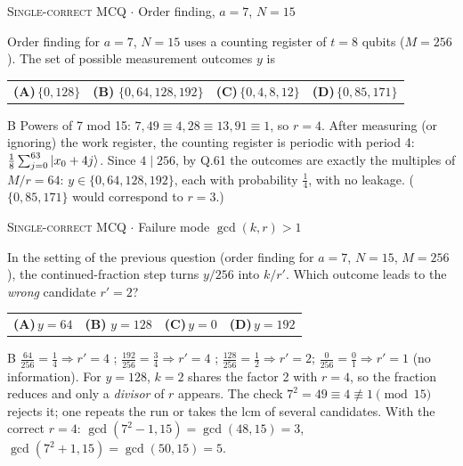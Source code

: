 \documentclass[11pt,a4paper]{article}
\newcommand{\optlabel}[1]{\textbf{(#1)}}
\newcommand{\correctlabel}[1]{\textcolor{okgreen}{\textbf{(#1)}\,\ding{51}}}
\newenvironment{qitem}[1]{\begin{list}{}{\setlength{\leftmargin}{3.3em}\setlength{\labelwidth}{3.1em}%
  \setlength{\labelsep}{0.2em}\setlength{\topsep}{3pt}\setlength{\parsep}{3pt}}\item[\textbf{Q.#1}\hfill]}{\end{list}}
\newcommand{\qsep}{\par\vspace{2pt}{\color{black!15}\hrule}\vspace{4pt}}
\newcommand{\qmeta}[2]{{\footnotesize\color{black!60}\textsc{#1} \;$\cdot$\; #2}\par}
\begin{document}
\begin{qitem}{69}
\qmeta{Single-correct MCQ}{Order finding, $a = 7$, $N = 15$}
Order finding for $a = 7$, $N = 15$ uses a counting register of $t = 8$ qubits ($M = 256$). The set of possible
measurement outcomes $y$ is
\par\smallskip\noindent\begin{tabularx}{\linewidth}{@{}*{4}{L}@{}}
\optlabel{A}\,$\{0, 128\}$ & \correctlabel{B}\,$\{0, 64, 128, 192\}$ & \optlabel{C}\,$\{0, 4, 8, 12\}$ & \optlabel{D}\,$\{0, 85, 171\}$
\end{tabularx}
\end{qitem}
\begin{solbox}{B}
Powers of 7 mod 15: $7, 49 \equiv 4, 28 \equiv 13, 91 \equiv 1$, so $r = 4$. After measuring (or ignoring) the work register,
the counting register is periodic with period 4: $\frac{1}{8}\sum_{j=0}^{63}\ket{x_0 + 4j}$. Since $4 \mid 256$, by Q.61 the
outcomes are exactly the multiples of $M/r = 64$: $y \in \{0, 64, 128, 192\}$, each with probability $\frac14$, with no
leakage. ($\{0,85,171\}$ would correspond to $r = 3$.)
\end{solbox}
\qsep

\begin{qitem}{70}
\qmeta{Single-correct MCQ}{Failure mode $\gcd(k, r) > 1$}
In the setting of the previous question (order finding for $a = 7$, $N = 15$, $M = 256$), the continued-fraction step
turns $y/256$ into $k/r'$. Which outcome leads to the \emph{wrong} candidate $r' = 2$?
\par\smallskip\noindent\begin{tabularx}{\linewidth}{@{}*{4}{L}@{}}
\optlabel{A}\,$y = 64$ & \correctlabel{B}\,$y = 128$ & \optlabel{C}\,$y = 0$ & \optlabel{D}\,$y = 192$
\end{tabularx}
\end{qitem}
\begin{solbox}{B}
$\frac{64}{256} = \frac14 \Rightarrow r' = 4$ \checkmark; $\frac{192}{256} = \frac34 \Rightarrow r' = 4$ \checkmark;
$\frac{128}{256} = \frac12 \Rightarrow r' = 2$; $\frac{0}{256} = \frac01 \Rightarrow r' = 1$ (no information).
For $y = 128$, $k = 2$ shares the factor 2 with $r = 4$, so the fraction reduces and only a \emph{divisor} of $r$ appears.
The check $7^2 = 49 \equiv 4 \not\equiv 1 \pmod{15}$ rejects it; one repeats the run or takes the lcm of several candidates.
With the correct $r = 4$: $\gcd(7^2 - 1, 15) = \gcd(48, 15) = 3$, $\gcd(7^2 + 1, 15) = \gcd(50, 15) = 5$.
\end{solbox}
\qsep
\end{document}
